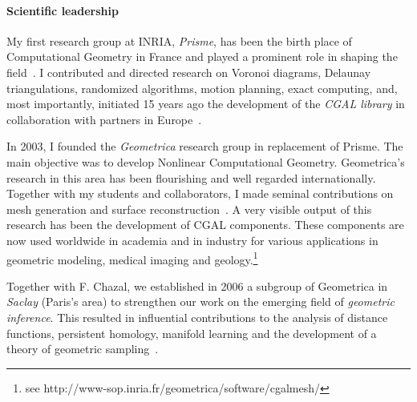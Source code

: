 
\paragraph{Scientific leadership} \mbox{}


My first research group at INRIA, {\em Prisme}, has been the birth place of Computational Geometry in France and played a prominent role in shaping the field~\cite{by-ag-98}. 
I contributed and directed research on Voronoi diagrams, Delaunay triangulations, randomized algorithms, motion planning, exact computing, and, most importantly, initiated 15 years ago the development of the {\em CGAL library} in collaboration with partners in Europe~\cite{cgal}.

In 2003, I founded the {\em Geometrica} research group in replacement of Prisme. The main objective was to develop Nonlinear Computational Geometry. 
 Geometrica's research in this area has been flourishing and well regarded internationally. Together with my students and collaborators, I made seminal contributions on mesh generation and surface reconstruction~\cite{geometrica-ecg-book}. A very visible output of this research has been the development of CGAL components. These components are now used worldwide in academia and in industry for various applications in geometric modeling, medical imaging and geology.\footnote{see http://www-sop.inria.fr/geometrica/software/cgalmesh/}

Together with F. Chazal, we established in 2006 a subgroup of Geometrica in {\em Saclay} (Paris's area)  to strengthen our work on  the emerging field of {\em geometric inference}.  This resulted in influential contributions to the analysis of distance functions, persistent homology, manifold learning and the development of a theory of geometric sampling~\cite{geometrica-bgo-09,geometrica-ccl09}.
\newpage


